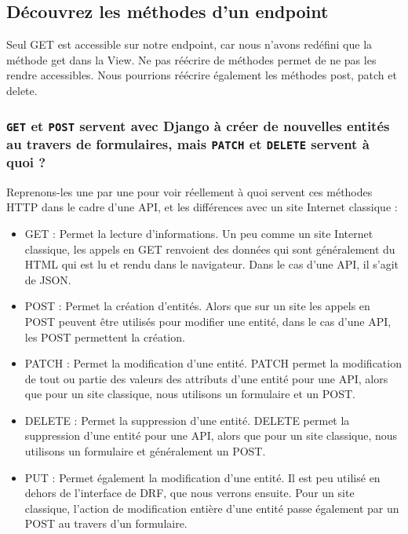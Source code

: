 \documentclass[a4paper]{article}
\begin{document}
\subsection{Découvrez les méthodes d’un {\color{monOrange}endpoint}}
Seul {\color{monOrange}GET} est accessible sur notre endpoint, car nous n’avons redéfini que la méthode  {\color{monOrange}get}  dans la {\color{monOrange}View}. Ne pas réécrire de méthodes permet de ne pas les rendre accessibles. Nous pourrions réécrire également les méthodes  {\color{monOrange}post,  patch}  et  {\color{monOrange}delete}. 

\subsubsection{{\tt GET} et {\tt POST} servent avec Django à créer de nouvelles entités au travers de formulaires, mais {\tt PATCH} et {\tt DELETE} servent à quoi ?}
Reprenons-les une par une pour voir réellement à quoi servent ces méthodes HTTP dans le cadre d’une API, et les différences avec un site Internet classique :
\begin{itemize}
\item {\color{monOrange}GET} : Permet la lecture d'informations.
Un peu comme un site Internet classique, les appels en GET renvoient des données qui sont généralement du HTML qui est lu et rendu dans le navigateur. Dans le cas d’une API, il s’agit de JSON.
\item {\color{monOrange}POST} : Permet la création d’entités.
Alors que sur un site les appels en POST peuvent être utilisés pour modifier une entité, dans le cas d’une API, les POST permettent la création.
\item {\color{monOrange}PATCH} : Permet la modification d’une entité.
PATCH permet la modification de tout ou partie des valeurs des attributs d’une entité pour une API, alors que pour un site classique, nous utilisons un formulaire et un POST.
\item {\color{monOrange}DELETE} : Permet la suppression d’une entité.
DELETE permet la suppression d’une entité pour une API, alors que pour un site classique, nous utilisons un formulaire et généralement un POST.
\item {\color{monOrange}PUT} : Permet également la modification d’une entité.
Il est peu utilisé en dehors de l’interface de DRF, que nous verrons ensuite. Pour un site classique, l’action de modification entière d’une entité passe également par un POST au travers d’un formulaire.
\end{itemize}
\end{document}
